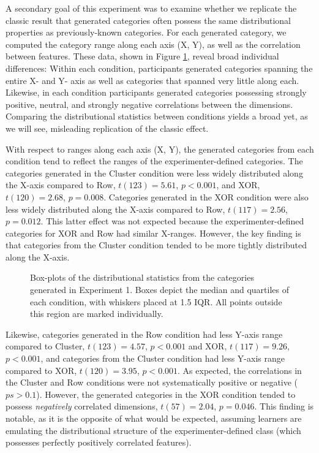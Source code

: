 \documentclass[12pt]{article}
\newcommand\inputpgf[2]{{
\let\pgfimageWithoutPath\pgfimage
\renewcommand{\pgfimage}[2][]{\pgfimageWithoutPath[##1]{#1/##2}}

}}
\begin{document}
\begin{flushleft}
A secondary goal of this experiment was to examine whether we replicate the
classic result that generated categories often possess the same distributional
properties as previously-known categories. For each generated category, we
computed the category range along each axis (X, Y), as well as the correlation
between features. These data, shown in Figure \ref{fig:e1-statsboxes}, reveal
broad individual differences: Within each condition, participants generated
categories spanning the entire X- and Y- axis as well as categories that spanned
very little along each. Likewise, in each condition participants generated
categories possessing strongly positive, neutral, and strongly negative
correlations between the dimensions. Comparing the distributional statistics
between conditions yields a broad yet, as we will see, misleading replication of
the classic effect.

With respect to ranges along each axis (X, Y), the generated categories from
each condition tend to reflect the ranges of the experimenter-defined
categories. The categories generated in the Cluster condition were less widely
distributed along the X-axis compared to Row, $t(123) = 5.61$, $p < 0.001$, and
XOR, $t(120) = 2.68$, $p = 0.008$. Categories generated in the XOR condition
were also less widely distributed along the X-axis compared to Row, $t(117) =
2.56$, $p = 0.012$. This latter effect was not expected because the
experimenter-defined categories for XOR and Row had similar X-ranges. However,
the key finding is that categories from the Cluster condition tended to be more
tightly distributed along the X-axis.

\begin{figure}
    \begin{center} \inputpgf{figs/}{e1-statsboxes.pgf}
    \caption{Box-plots of the distributional statistics from the categories
generated in Experiment 1. Boxes depict the median and quartiles of each
condition, with whiskers placed at 1.5 IQR. All points outside this region are
marked individually.}
    \label{fig:e1-statsboxes}
    \end{center}
\end{figure}


Likewise, categories generated in the Row condition had less Y-axis range
compared to Cluster, $t(123) = 4.57$, $p < 0.001$ and XOR, $t(117) = 9.26$, $p <
0.001$, and categories from the Cluster condition had less Y-axis range compared
to XOR, $t(120) = 3.95$, $p < 0.001$. As expected, the correlations in the
Cluster and Row conditions were not systematically positive or negative ($ps >
0.1$). However, the generated categories in the XOR condition tended to possess
{\em negatively} correlated dimensions, $t(57) = 2.04$, $p = 0.046$. This
finding is notable, as it is the opposite of what would be expected, assuming
learners are emulating the distributional structure of the experimenter-defined
class (which possesses perfectly positively correlated features).


\end{flushleft}
\end{document}

